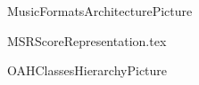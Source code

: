 \documentclass[11pt,a4paper]{report}
\begin{document}
\useRegularPagesHeadersAndFooters

{MusicFormatsArchitecturePicture}

{MSRScoreRepresentation.tex}

{OAHClassesHierarchyPicture}



\useListsPagesHeadersAndFooters


\end{document}
